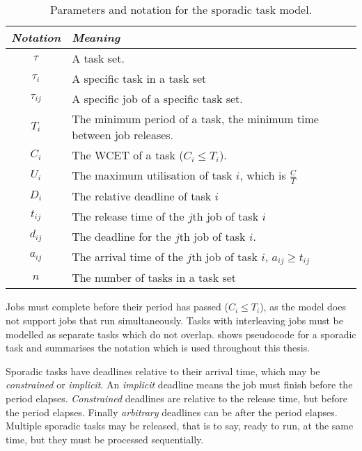 \begin{table}[b]
\centering
\begin{tabularx}{\textwidth}{cX}\toprule
    \emph{Notation} & \emph{Meaning} \\\midrule
    $\tau$               & A task set. \\
    $\tau_{i}$           & A specific task in a task set \\
    $\tau_{ij}$          & A specific job of a specific task set. \\
    $T_{i}$           & The minimum period of a task, the minimum time between job releases. \\
        $C_{i}$       & The \gls{WCET} of a task ($C_{i} \leq T_{i}$). \\
    $U_{i}$           & The maximum utilisation of task $i$, which is $\frac{C}{T}$ \\
    $D_{i}$           & The relative deadline of task $i$ \\
    $t_{ij}$          & The release time of the $j$th job of task $i$ \\
    $d_{ij}$          & The deadline for the $j$th job of task $i$. \\
    $a_{ij}$          & The arrival time of the $j$th job of task $i$, $a_{ij} \geq t_{ij}$ \\
    $n$               & The number of tasks in a task set\\
    \bottomrule
    \end{tabularx}
    \caption{Parameters and notation for the sporadic task model.}
    \label{t:notation}
\end{table}

Jobs must complete before their period has passed ($C_{i} \leq T_{i}$), as the model does not
support jobs that run simultaneously. Tasks with interleaving jobs must be modelled as separate
tasks which do not overlap.   shows pseudocode for a sporadic task and
 summarises the notation which is used throughout this thesis.

Sporadic tasks have deadlines relative to their arrival time, which may be \emph{constrained} or
\emph{implicit}.  An \emph{implicit} deadline means the job must finish before the period elapses.
\emph{Constrained} deadlines are relative to the release time, but before the period elapses.
Finally \emph{arbitrary} deadlines can be after the period elapses. Multiple sporadic tasks may be
released, that is to say, ready to run, at the same time, but they must be processed sequentially.

